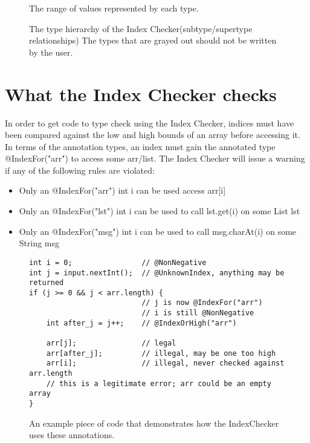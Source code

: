 \begin{figure}
\caption{The range of values represented by each type.}
\label{fig-index-figure}
\end{figure}

\begin{figure}
\caption{The type hierarchy of the Index Checker(subtype/supertype relationships)
The types that are grayed out should not be written by the user.}
\label{fig-index-heirarchy}
\end{figure}

\section{What the Index Checker checks\label{index-checks}}
In order to get code to type check using the Index Checker, indices must have been
compared against the low and high bounds of an array before accessing it. In terms
of the annotation types, an index must gain the annotated type @IndexFor("arr") to access some
arr/list. The Index Checker will issue a warning if any of the following rules are violated:
\begin{itemize}
\item Only an @IndexFor("arr") int i can be used access arr[i]
\item Only an @IndexFor("lst") int i can be used to call lst.get(i) on some List lst
\item Only an @IndexFor("msg") int i can be used to call msg.charAt(i) on some String msg
\end{itemize}

\begin{figure}
\begin{Verbatim}
int i = 0;                // @NonNegative
int j = input.nextInt();  // @UnknownIndex, anything may be returned
if (j >= 0 && j < arr.length) {
                          // j is now @IndexFor("arr")
                          // i is still @NonNegative
    int after_j = j++;    // @IndexOrHigh("arr")

    arr[j];               // legal
    arr[after_j];         // illegal, may be one too high
    arr[i];               // illegal, never checked against arr.length
    // this is a legitimate error; arr could be an empty array
}
\end{Verbatim}
\caption{An example piece of code that demonstrates how the IndexChecker uses these annotations.}
\label{fig-index-heirarchy}
\end{figure}

